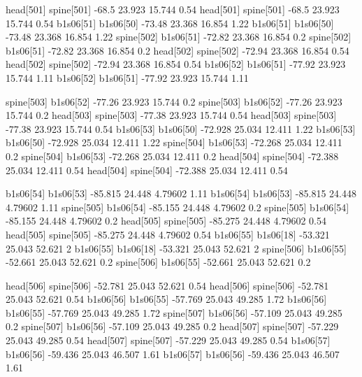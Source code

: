 head[501]    spine[501]    -68.5    23.923    15.744    0.54
head[501]    spine[501]    -68.5    23.923    15.744    0.54
b1s06[51]    b1s06[50]    -73.48    23.368    16.854    1.22
b1s06[51]    b1s06[50]    -73.48    23.368    16.854    1.22
spine[502]    b1s06[51]    -72.82    23.368    16.854    0.2
spine[502]    b1s06[51]    -72.82    23.368    16.854    0.2
head[502]    spine[502]    -72.94    23.368    16.854    0.54
head[502]    spine[502]    -72.94    23.368    16.854    0.54
b1s06[52]    b1s06[51]    -77.92    23.923    15.744    1.11
b1s06[52]    b1s06[51]    -77.92    23.923    15.744    1.11


spine[503]    b1s06[52]    -77.26    23.923    15.744    0.2
spine[503]    b1s06[52]    -77.26    23.923    15.744    0.2
head[503]    spine[503]    -77.38    23.923    15.744    0.54
head[503]    spine[503]    -77.38    23.923    15.744    0.54
b1s06[53]    b1s06[50]    -72.928    25.034    12.411    1.22
b1s06[53]    b1s06[50]    -72.928    25.034    12.411    1.22
spine[504]    b1s06[53]    -72.268    25.034    12.411    0.2
spine[504]    b1s06[53]    -72.268    25.034    12.411    0.2
head[504]    spine[504]    -72.388    25.034    12.411    0.54
head[504]    spine[504]    -72.388    25.034    12.411    0.54


b1s06[54]    b1s06[53]    -85.815    24.448    4.79602    1.11
b1s06[54]    b1s06[53]    -85.815    24.448    4.79602    1.11
spine[505]    b1s06[54]    -85.155    24.448    4.79602    0.2
spine[505]    b1s06[54]    -85.155    24.448    4.79602    0.2
head[505]    spine[505]    -85.275    24.448    4.79602    0.54
head[505]    spine[505]    -85.275    24.448    4.79602    0.54
b1s06[55]    b1s06[18]    -53.321    25.043    52.621    2
b1s06[55]    b1s06[18]    -53.321    25.043    52.621    2
spine[506]    b1s06[55]    -52.661    25.043    52.621    0.2
spine[506]    b1s06[55]    -52.661    25.043    52.621    0.2


head[506]    spine[506]    -52.781    25.043    52.621    0.54
head[506]    spine[506]    -52.781    25.043    52.621    0.54
b1s06[56]    b1s06[55]    -57.769    25.043    49.285    1.72
b1s06[56]    b1s06[55]    -57.769    25.043    49.285    1.72
spine[507]    b1s06[56]    -57.109    25.043    49.285    0.2
spine[507]    b1s06[56]    -57.109    25.043    49.285    0.2
head[507]    spine[507]    -57.229    25.043    49.285    0.54
head[507]    spine[507]    -57.229    25.043    49.285    0.54
b1s06[57]    b1s06[56]    -59.436    25.043    46.507    1.61
b1s06[57]    b1s06[56]    -59.436    25.043    46.507    1.61


